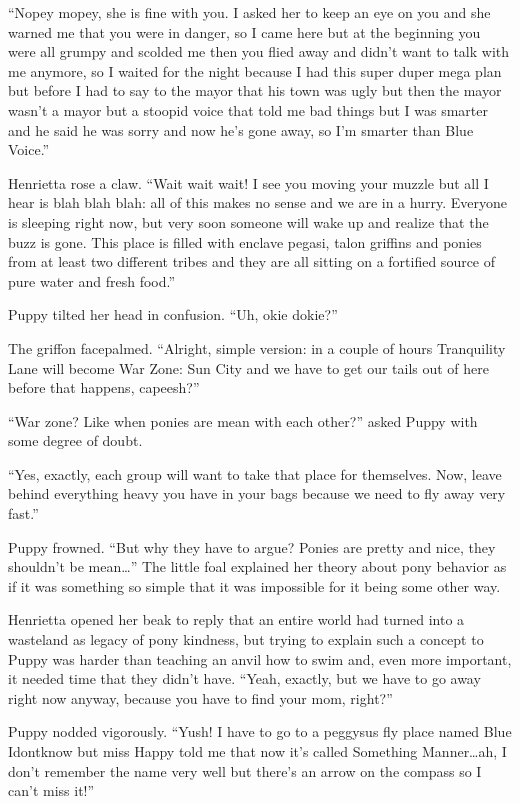 ``Nopey mopey, she is fine with you. I asked her to keep an eye on you and she warned me that you were in danger, so I came here but at the beginning you were all grumpy and scolded me then you flied away and didn't want to talk with me anymore, so I waited for the night because I had this super duper mega plan but before I had to say to the mayor that his town was ugly but then the mayor wasn't a mayor but a stoopid voice that told me bad things but I was smarter and he said he was sorry and now he's gone away, so I'm smarter than Blue Voice.''

Henrietta rose a claw. ``Wait wait wait! I see you moving your muzzle but all I hear is blah blah blah: all of this makes no sense and we are in a hurry. Everyone is sleeping right now, but very soon someone will wake up and realize that the buzz is gone. This place is filled with enclave pegasi, talon griffins and ponies from at least two different tribes and they are all sitting on a fortified source of pure water and fresh food.''

Puppy tilted her head in confusion. ``Uh, okie dokie?''

The griffon facepalmed. ``Alright, simple version: in a couple of hours Tranquility Lane will become War Zone: Sun City and we have to get our tails out of here before that happens, capeesh?''

``War zone? Like when ponies are mean with each other?'' asked Puppy with some degree of doubt.

``Yes, exactly, each group will want to take that place for themselves. Now, leave behind everything heavy you have in your bags because we need to fly away very fast.''

Puppy frowned. ``But why they have to argue? Ponies are pretty and nice, they shouldn't be mean\dots'' The little foal explained her theory about pony behavior as if it was something so simple that it was impossible for it being some other way.

Henrietta opened her beak to reply that an entire world had turned into a wasteland as legacy of pony kindness, but trying to explain such a concept to Puppy was harder than teaching an anvil how to swim and, even more important, it needed time that they didn't have. ``Yeah, exactly, but we have to go away right now anyway, because you have to find your mom, right?''

Puppy nodded vigorously. ``Yush! I have to go to a peggysus fly place named Blue Idontknow but miss Happy told me that now it's called Something Manner\dots ah, I don't remember the name very well but there's an arrow on the compass so I can't miss it!''


